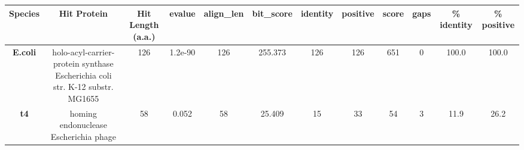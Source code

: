 \begin{tabular}{|c|c|c|c|c|c|c|c|c|c|c|c|} \hline
\textbf{Species} & \textbf{Hit Protein} & \textbf{Hit Length (a.a.)} & \textbf{evalue} & \textbf{align\_len} & \textbf{bit\_score} & \textbf{identity} & \textbf{positive} & \textbf{score} & \textbf{gaps} & \textbf{\% identity} & \textbf{\% positive} \\ \hline
\textbf{E.coli} & holo-acyl-carrier-protein synthase Escherichia coli str. K-12 substr. MG1655 & 126 & 1.2e-90 & 126 & 255.373 & 126 & 126 & 651 & 0 & 100.0 & 100.0\\
\textbf{t4} & homing endonuclease Escherichia phage  & 58 & 0.052 & 58 & 25.409 & 15 & 33 & 54 & 3 & 11.9 & 26.2\\
\hline \end{tabular}
